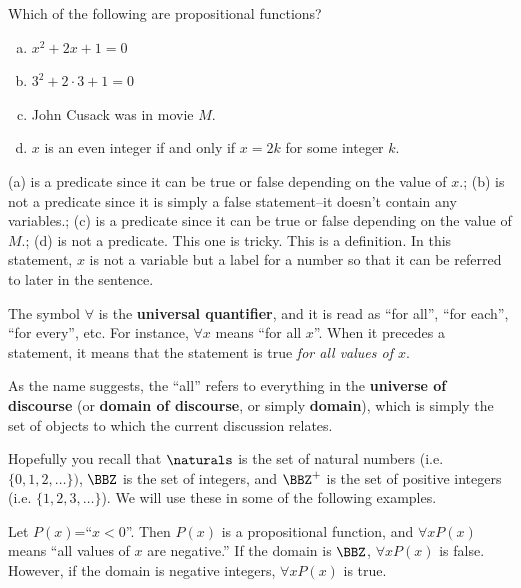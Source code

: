 \begin{exer}
Which of the following are propositional functions?
\begin{enumerate}[(a)]
\item {} $x^2+2x+1=0$
\item {} $3^2+2\cdot 3 + 1 = 0$
\item {} John Cusack was in movie $M$.
\item {} $x$ is an even integer if and only if $x=2k$ for some integer $k$.
\end{enumerate}
\begin{answer}
(a) is a predicate since it can be true or false depending on the value of $x$.;
(b) is not a predicate since it is simply a false statement--it doesn't contain any variables.;
(c) is a predicate since it can be true or false depending on the value of $M$.;
(d) is not a predicate.  This one is tricky.  This is a definition.
In this statement, $x$ is not a variable but a label for a number so that it can be referred to later in the sentence.
\end{answer}
\end{exer}


\begin{df}
The symbol $\forall$ is the {\bf universal quantifier}, and it is read as ``for all'',
``for each'', ``for every'', etc.
For instance, $\forall x$ means ``for all $x$''.  When it precedes a statement, 
it means that the statement is true {\em  for all values of $x$}.

As the name suggests, the ``all'' refers to everything in the 
{\bf universe of discourse} (or {\bf domain of discourse}, or simply {\bf domain}), which 
is simply the set of objects to which the current discussion relates.
\end{df}

Hopefully you recall that $\naturals$ is the set of natural numbers 
(i.e. $\{0, 1, 2, \ldots\})$,
$\BBZ$ is the set of integers, 
and $\BBZ^+$ is the set of 
positive integers (i.e. $\{1, 2, 3, \ldots\}$).
We will use these in some of the following examples.

\begin{exa}
Let $P(x)$=``$x<0$''.  Then $P(x)$ is a propositional function, and $\forall x P(x)$ means ``all values of $x$ are negative.''
If the domain is $\BBZ$, $\forall x P(x)$ is false.  
However, if the domain is negative integers, $\forall x P(x)$ is true.
\end{exa}


